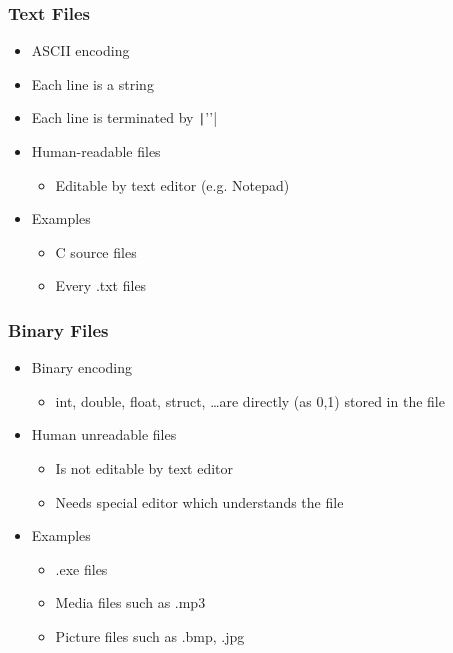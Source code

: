 \documentclass{../c-lecture}
\begin{document}
\begin{frame}[fragile]
  \frametitle{Text Files}
  \begin{itemize}
    \item ASCII encoding
    \item Each line is a string
    \item Each line is terminated by \texttt|'\n'|
    \item Human-readable files
    \begin{itemize}
      \item Editable by text editor (e.g. Notepad)
    \end{itemize}
    \item Examples
    \begin{itemize}
      \item C source files
      \item Every .txt files
    \end{itemize}
  \end{itemize}
\end{frame}

\begin{frame}
  \frametitle{Binary Files}
  \begin{itemize}
    \item Binary encoding
    \begin{itemize}
      \item
        int, double, float, struct, \ldots are directly (as 0,1) stored in the file
    \end{itemize}
    \item Human \textcolor{RubineRed}{un}readable files
    \begin{itemize}
      \item Is not editable by text editor
      \item Needs special editor which understands the file
    \end{itemize}
    \item Examples
    \begin{itemize}
      \item .exe files
      \item Media files such as .mp3
      \item Picture files such as .bmp, .jpg
    \end{itemize}
  \end{itemize}
\end{frame}
\end{document}
